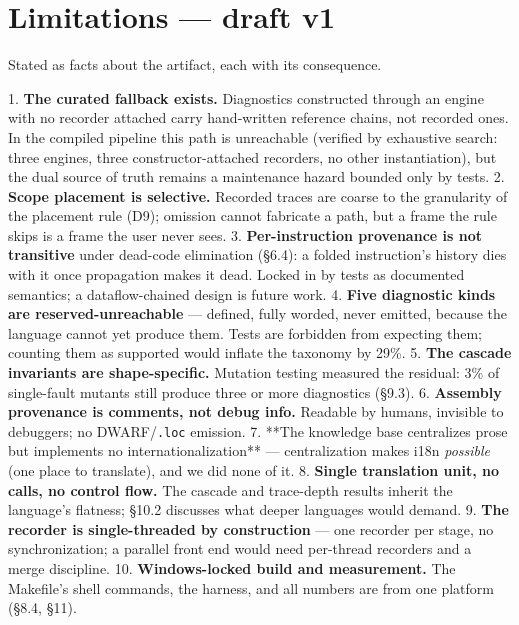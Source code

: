 \section{Limitations --- draft v1}
\label{sec:limitations}

Stated as facts about the artifact, each with its consequence.

1. \textbf{The curated fallback exists.} Diagnostics constructed through
   an engine with no recorder attached carry hand-written reference
   chains, not recorded ones. In the compiled pipeline this path is
   unreachable (verified by exhaustive search: three engines, three
   constructor-attached recorders, no other instantiation), but the
   dual source of truth remains a maintenance hazard bounded only by
   tests.
2. \textbf{Scope placement is selective.} Recorded traces are coarse to
   the granularity of the placement rule (D9); omission cannot
   fabricate a path, but a frame the rule skips is a frame the user
   never sees.
3. \textbf{Per-instruction provenance is not transitive} under dead-code
   elimination (\S6.4): a folded instruction's history dies with it
   once propagation makes it dead. Locked in by tests as documented
   semantics; a dataflow-chained design is future work.
4. \textbf{Five diagnostic kinds are reserved-unreachable} --- defined,
   fully worded, never emitted, because the language cannot yet
   produce them. Tests are forbidden from expecting them; counting
   them as supported would inflate the taxonomy by 29\%.
5. \textbf{The cascade invariants are shape-specific.} Mutation testing
   measured the residual: 3\% of single-fault mutants still produce
   three or more diagnostics (\S9.3).
6. \textbf{Assembly provenance is comments, not debug info.} Readable by
   humans, invisible to debuggers; no DWARF/\texttt{.loc} emission.
7. **The knowledge base centralizes prose but implements no
   internationalization** --- centralization makes i18n \emph{possible}
   (one place to translate), and we did none of it.
8. \textbf{Single translation unit, no calls, no control flow.} The
   cascade and trace-depth results inherit the language's flatness;
   \S10.2 discusses what deeper languages would demand.
9. \textbf{The recorder is single-threaded by construction} --- one
   recorder per stage, no synchronization; a parallel front end
   would need per-thread recorders and a merge discipline.
10. \textbf{Windows-locked build and measurement.} The Makefile's shell
    commands, the harness, and all numbers are from one platform
    (\S8.4, \S11).



